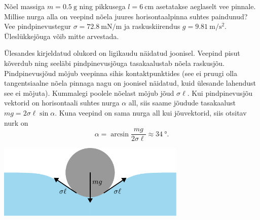 
Nõel massiga $m=\SI{0.5}{\g}$ ning pikkusega $l=\SI{6}{\cm}$ asetatakse aeglaselt vee pinnale. Millise nurga alla on veepind nõela juures horisontaalpinna suhtes paindunud? Vee pindpinevustegur $\sigma=\SI{72.8}{\mN\per\m}$ ja raskuskiirendus $g=\SI{9.81}{\m\per\s\squared}$. Üleslükkejõuga võib mitte arvestada.


\hint

\solu
\par
Ülesandes kirjeldatud olukord on ligikaudu näidatud joonisel. Veepind pisut kõverdub ning seeläbi pindpinevusjõuga tasakaalustab nõela raskusjõu. Pindpinevusjõud mõjub veepinna sihis kontaktpunktides (see ei pruugi olla tangentsiaalne nõela pinnaga nagu on joonisel näidatud, kuid ülesande lahendust see ei mõjuta). Kummalegi poolele nõelast mõjub jõud $\sigma \ell$. Kui pindpinevusjõu vektorid on horisontaali suhtes nurga $\alpha$ all, siis saame jõudude tasakaalust \(mg = 2 \sigma \ell \sin \alpha\). Kuna veepind on sama nurga all kui jõuvektorid, siis otsitav nurk on
\[
\alpha = \arcsin{\frac{mg}{2\sigma \ell}} \approx \SI{34}{\degree}.
\]
\begin{center}
  \includegraphics[width=9cm]{2023-v3g-06-yl.pdf}
\end{center}
\probend